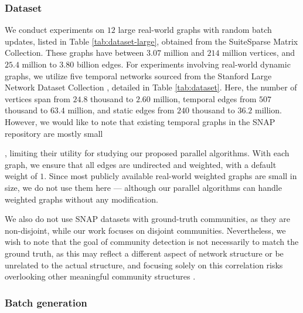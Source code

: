 \subsubsection{Dataset}
\label{sec:dataset}

We conduct experiments on $12$ large real-world graphs with random batch updates, listed in Table \ref{tab:dataset-large}, obtained from the SuiteSparse Matrix Collection. These graphs have between $3.07$ million and $214$ million vertices, and $25.4$ million to $3.80$ billion edges. For experiments involving real-world dynamic graphs, we utilize five temporal networks sourced from the Stanford Large Network Dataset Collection \cite{snapnets}, detailed in Table \ref{tab:dataset}. Here, the number of vertices span from $24.8$ thousand to $2.60$ million, temporal edges from $507$ thousand to $63.4$ million, and static edges from $240$ thousand to $36.2$ million. However, we would like to note that existing temporal graphs in the SNAP repository \cite{snapnets} are mostly small, limiting their utility for studying our proposed parallel algorithms. With each graph, we ensure that all edges are undirected and weighted, with a default weight of $1$. Since most publicly available real-world weighted graphs are small in size, we do not use them here --- although our parallel algorithms can handle weighted graphs without any modification.

We also do not use SNAP datasets with ground-truth communities, as they are non-disjoint, while our work focuses on disjoint communities. Nevertheless, we wish to note that the goal of community detection is not necessarily to match the ground truth, as this may reflect a different aspect of network structure or be unrelated to the actual structure, and focusing solely on this correlation risks overlooking other meaningful community structures \cite{peel2017ground}.


\subsubsection{Batch generation}
\label{sec:batch-generation}

